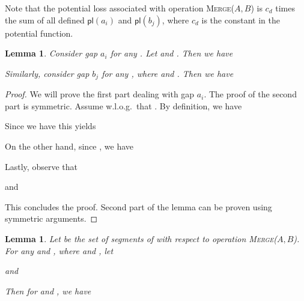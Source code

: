 \documentclass[11pt]{article}
\newcommand{\ens}[1]{\ensuremath{#1}}
\newcommand{\kwUnion}{Merge}
\newcommand{\Unionx}[2]{\mbox{\textsc{\kwUnion(\ensuremath{#1,#2})}}}
\newcommand{\segments}{{\segment}s}
\newcommand{\segment}{segment}
\newcommand{\cons}[1]{\ensuremath{c_{#1}}}
\newcommand{\cnsd}{\cons d}
\newcommand{\agap}[1]{\ensuremath{a_{#1}}}
\newcommand{\bgap}[1]{\ensuremath{b_{#1}}}
\newcommand{\potlossa}[1]{\ens{\mathsf{pl}(\agap{#1})}}
\newcommand{\potlossb}[1]{\ens{\mathsf{pl}(\bgap{#1})}}
\newcounter{count}
\newtheorem{lemma}[count]{Lemma}
\begin{document}
Note that the potential loss associated with operation \Unionx{A}{B} is \cnsd{} times the sum of all defined \potlossa i and \potlossb j, where \cnsd{} is the constant in the potential function. 


\begin{lemma} 
\label{lem:gapratio} 
Consider gap \agap i for any . Let  and . Then we have 
 
\noindent Similarly, consider gap \bgap j for any , where  and . Then we have 
 
\end{lemma} 



\begin{proof} 
We will prove the first part dealing with gap \agap i. The proof of the second part is symmetric. Assume w.l.o.g.~that . By definition, we have
 
Since we have  this yields
 
On the other hand, since , we have
 
Lastly, observe that 
 
and 
 
This concludes the proof. Second part of the lemma can be proven using symmetric arguments. 

\end{proof} 


\begin{lemma} 
\label{lem:costeqpotloss} 
Let  be the set of \segments{} of  with respect to operation \Unionx{A}{B}. For any  and , where  and , let 
 
and 
 
Then for  and , we have 
 
\end{lemma} 
\end{document}
